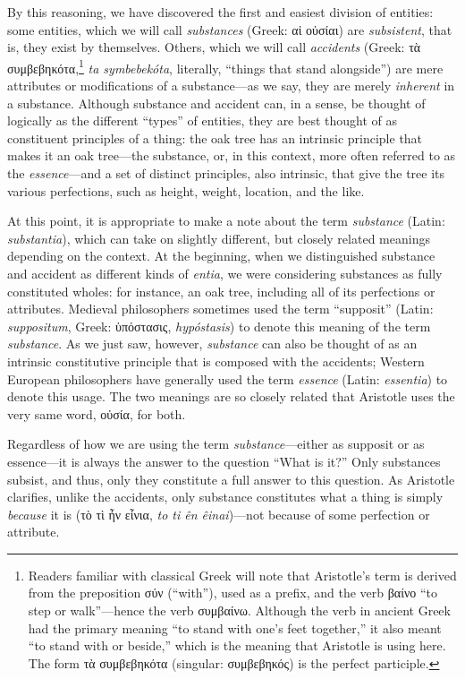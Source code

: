 \documentclass[
  12pt,
]{memoir}
\begin{document}
By this reasoning, we have discovered the first and easiest division of
entities: some entities, which we will call \emph{substances} (Greek: αἱ
οὐσίαι) are \emph{subsistent}, that is, they exist by themselves.
Others, which we will call \emph{accidents} (Greek: τὰ
συμβεβηκότα,\footnote{Readers familiar with classical Greek will note
  that Aristotle's term is derived from the preposition σύν (``with''),
  used as a prefix, and the verb βαίνο ``to step or walk''---hence the
  verb συμβαίνω. Although the verb in ancient Greek had the primary
  meaning ``to stand with one's feet together,'' it also meant ``to
  stand with or beside,'' which is the meaning that Aristotle is using
  here. The form τὰ συμβεβηκότα (singular: συμβεβηκός) is the perfect
  participle.} \emph{ta symbebekóta}, literally, ``things that stand
alongside'') are mere attributes or modifications of a substance---as we
say, they are merely \emph{inherent} in a substance. Although substance
and accident can, in a sense, be thought of logically as the different
``types'' of entities, they are best thought of as constituent
principles of a thing: the oak tree has an intrinsic principle that
makes it an oak tree---the substance, or, in this context, more often
referred to as the \emph{essence}---and a set of distinct principles,
also intrinsic, that give the tree its various perfections, such as
height, weight, location, and the like.

At this point, it is appropriate to make a note about the term
\emph{substance} (Latin: \emph{substantia}), which can take on slightly
different, but closely related meanings depending on the context. At the
beginning, when we distinguished substance and accident as different
kinds of \emph{entia}, we were considering substances as fully
constituted wholes: for instance, an oak tree, including all of its
perfections or attributes. Medieval philosophers sometimes used the term
``supposit'' (Latin: \emph{suppositum}, Greek: ὑπόστασις,
\emph{hypóstasis}) to denote this meaning of the term \emph{substance}.
As we just saw, however, \emph{substance} can also be thought of as an
intrinsic constitutive principle that is composed with the accidents;
Western European philosophers have generally used the term
\emph{essence} (Latin: \emph{essentia}) to denote this usage. The two
meanings are so closely related that Aristotle uses the very same word,
οὐσία, for both.

Regardless of how we are using the term \emph{substance}---either as
supposit or as essence---it is always the answer to the question ``What
is it?'' Only substances subsist, and thus, only they constitute a full
answer to this question. As Aristotle clarifies, unlike the accidents,
only substance constitutes what a thing is simply \emph{because} it is
(τὸ τὶ ἦν εἶνια, \emph{to ti ên êinai})---not because of some perfection
or attribute.
\end{document}
